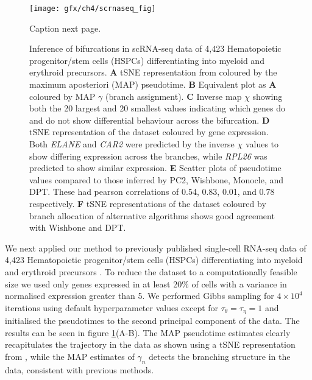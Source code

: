 \begin{figure}
	\centering
	\texttt{[image: gfx/ch4/scrnaseq\_fig]}
	\caption[]{Caption next page.}
	 \label{fig:scrnaseq}
\end{figure}
\addtocounter{figure}{-1}
\begin{figure}
\caption[Inference of bifurcations in scRNA-seq data of 4,423 Hematopoietic progenitor/stem cells.]{Inference of bifurcations in scRNA-seq data of 4,423 Hematopoietic progenitor/stem cells (HSPCs) differentiating into myeloid and erythroid precursors.
\textbf{A} tSNE representation from \cite{setty2016wishbone} coloured by the maximum aposteriori (MAP) pseudotime.
\textbf{B} Equivalent plot as \textbf{A} coloured by MAP $\gamma$ (branch assignment).
\textbf{C} Inverse map $\chi$ showing both the 20 largest and 20 smallest values indicating which genes do and do not show differential behaviour across the bifurcation.
\textbf{D} tSNE representation of the dataset coloured by gene expression. Both \emph{ELANE} and \emph{CAR2} were predicted by the inverse $\chi$ values to show differing expression across the branches, while \emph{RPL26} was predicted to show similar expression.
\textbf{E} Scatter plots of pseudotime values compared to those inferred by PC2, Wishbone, Monocle, and DPT. These had pearson correlations of 0.54, 0.83, 0.01, and 0.78 respectively.
\textbf{F} tSNE representations of the dataset coloured by branch allocation of alternative algorithms shows good agreement with Wishbone and DPT.}
\end{figure}


We next applied our method to previously published single-cell RNA-seq data of 4,423 Hematopoietic progenitor/stem cells (HSPCs) differentiating into myeloid and erythroid precursors \cite{paul2015transcriptional}.
To reduce the dataset to a computationally feasible size we used only genes expressed in at least 20\% of cells with a variance in normalised expression greater than 5.
We performed Gibbs sampling for $4 \times 10^4$ iterations using default hyperparameter values except for $\tau_\theta = \tau_\eta = 1$ and initialised the pseudotimes to the second principal component of the data.
The results can be seen in figure \ref{fig:scrnaseq}(A-B). The MAP pseudotime estimates  clearly recapitulates the trajectory in the data as shown using a tSNE representation from \cite{setty2016wishbone}, while the MAP estimates of $\gamma_n$ detects the branching structure in the data, consistent with previous methods.


